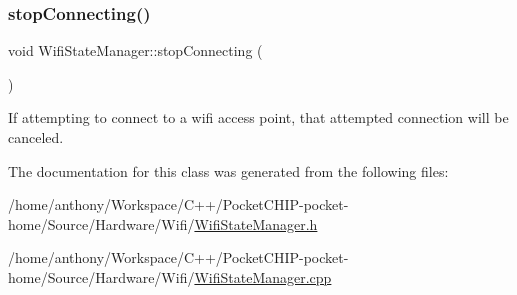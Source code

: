 \subsubsection{\texorpdfstring{stop\+Connecting()}{stopConnecting()}}
{\footnotesize\ttfamily void Wifi\+State\+Manager\+::stop\+Connecting (\begin{DoxyParamCaption}{ }\end{DoxyParamCaption})}

If attempting to connect to a wifi access point, that attempted connection will be canceled. 

The documentation for this class was generated from the following files\+:\begin{DoxyCompactItemize}
\item 
/home/anthony/\+Workspace/\+C++/\+Pocket\+C\+H\+I\+P-\/pocket-\/home/\+Source/\+Hardware/\+Wifi/\mbox{\hyperlink{WifiStateManager_8h}{Wifi\+State\+Manager.\+h}}\item 
/home/anthony/\+Workspace/\+C++/\+Pocket\+C\+H\+I\+P-\/pocket-\/home/\+Source/\+Hardware/\+Wifi/\mbox{\hyperlink{WifiStateManager_8cpp}{Wifi\+State\+Manager.\+cpp}}\end{DoxyCompactItemize}

